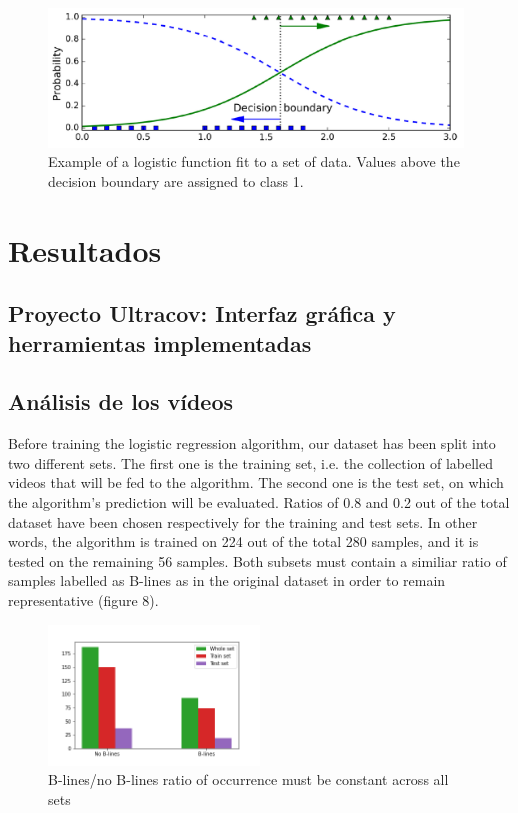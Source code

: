 \documentclass[11pt]{article} %
\begin{document}
	\begin{figure}
	\centering
	\includegraphics[width=11cm]{figuras/sigmoid.png}
	\caption{Example of a logistic function fit to a set of data. Values above the decision boundary are assigned to class 1. \cite{geron}}
	\end{figure}


\section{Resultados}

\subsection{Proyecto Ultracov: Interfaz gráfica y herramientas implementadas}

\subsection{Análisis de los vídeos}

	Before training the logistic regression algorithm, our dataset has been split into two different sets. The first one is the training set, i.e. the collection of labelled videos that will be fed to the algorithm. The second one is the test set, on which the algorithm's prediction will be evaluated. Ratios of 0.8 and 0.2  out of the total dataset have been chosen respectively for the training and test sets. In other words, the algorithm is trained on 224 out of the total 280 samples, and it is tested on the remaining 56 samples. Both subsets must contain a similiar ratio of samples labelled as B-lines as in the original dataset in order to remain representative (figure 8). 
	
	\begin{figure}
	\centering
	\includegraphics[width=0.5\textwidth]{figuras/bline_ratio.png}
	\caption{B-lines/no B-lines ratio of occurrence must be constant across all 		sets}
	\end{figure}
\end{document}
